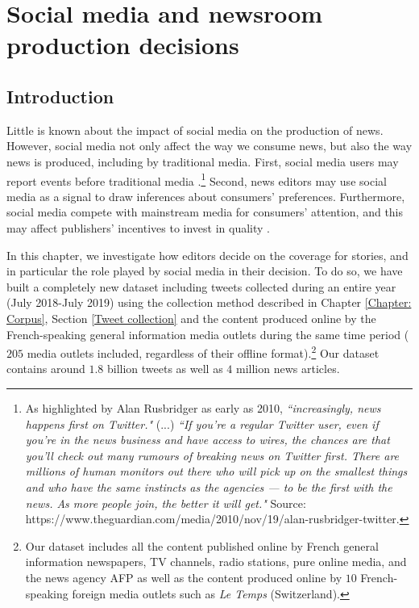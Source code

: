 \chapter{Social media and newsroom production decisions}
\label{Chap: Social media and newsroom production decisions}
\section{Introduction\label{Sec:Introduction}}

Little is known about the impact of social media on the production of news. However, social media not only affect the way we consume news, but also the way news is produced, including by traditional media. First, social media users may report events before traditional media \citep{Sakakietal2010}.\footnote{As highlighted by Alan Rusbridger as early as 2010, \textit{``increasingly, news happens first on Twitter."} (...) \textit{``If you're a regular Twitter user, even if you're in the news business and have access to wires, the chances are that you'll check out many rumours of breaking news on Twitter first. There are millions of human monitors out there who will pick up on the smallest things and who have the same instincts as the agencies — to be the first with the news. As more people join, the better it will get."} Source: https://www.theguardian.com/media/2010/nov/19/alan-rusbridger-twitter.} Second, news editors may use social media as a signal to draw inferences about consumers' preferences. Furthermore, social media compete with mainstream media for consumers' attention, and this may affect publishers' incentives to invest in quality \citep{deCorniereSarvary2019}.

In this chapter, we investigate how editors decide on the coverage for stories, and in particular the role played by social media in their decision. To do so, we have built a completely new dataset including tweets collected during an entire year (July 2018-July 2019) using the collection method described in Chapter \ref{Chapter: Corpus}, Section \ref{Tweet collection} and the content produced online by the French-speaking general information media outlets during the same time period ($205$ media outlets included, regardless of their offline format).\footnote{Our dataset includes all the content published online by French general information newspapers, TV channels, radio stations, pure online media, and the news agency AFP as well as the content produced online by $10$ French-speaking foreign media outlets such as \textit{Le Temps} (Switzerland).} Our dataset contains around $1.8$ billion tweets as well as $4$ million news articles.

